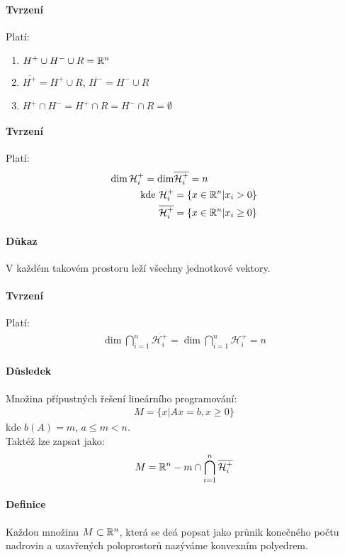 \documentclass[a4paper,12pt,titlepage]{article}
\begin{document}
\paragraph{Tvrzení}
Platí:
\begin{enumerate}
	\item $H^+ \cup H^- \cup R = \mathbb{R}^n$
	\item $\overline{H^+} = H^+ \cup R$, $\overline{H^-} = H^- \cup R$
	\item $H^+ \cap H^- = H^+ \cap R = H^- \cap R = \emptyset$
\end{enumerate}
\paragraph{Tvrzení}
Platí:
\begin{align}
	\dim \mathcal{H}_i^+ = \dim &\overline{\mathcal{H}_i^+} = n \\
	\text{kde } \mathcal{H}_i^+ &= \{ x \in \mathbb{R}^n | x_i > 0 \} \\
	\overline{\mathcal{H}_i^+} &= \{ x \in \mathbb{R}^n | x_i \ge 0 \}
\end{align}
\paragraph{Důkaz}
V každém takovém prostoru leží všechny jednotkové vektory.
\paragraph{Tvrzení}
Platí:
\begin{align}
	\dim \bigcap_{i=1}^n \overline{\mathcal{H}_i^+} = \dim \bigcap_{i=1}^n
	\mathcal{H}_i^+ = n
\end{align}
\paragraph{Důsledek}
Množina přípustných řešení lineárního programování:
\begin{align}
M = \{ x | Ax = b, x \ge 0 \}
\end{align}
kde $b(A) = m$, $a \le m < n$. \\
Taktéž lze zapsat jako:
\begin{align}
	M = \mathbb{R}^n-m \cap	\bigcap_{i=1}^n \overline{\mathcal{H}_i^+}
\end{align}
\paragraph{Definice}
Každou množinu $M \subset \mathbb{R}^n$, která se deá popsat jako průnik konečného počtu
nadrovin a uzavřených poloprostorů nazýváme konvexním polyedrem.
\end{document}
